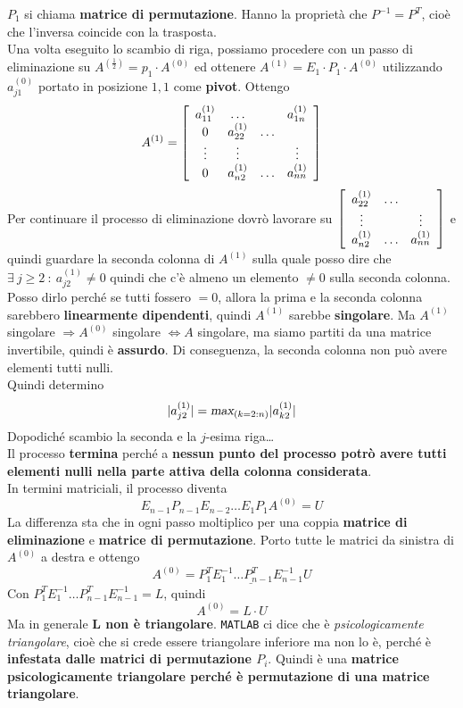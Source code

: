 \documentclass[10pt]{book}
\begin{document}
$P_1$ si chiama \textbf{matrice di permutazione}. Hanno la proprietà che $P^{-1} = P^{T}$, cioè che l'inversa coincide con la trasposta.\\
Una volta eseguito lo scambio di riga, possiamo procedere con un passo di eliminazione su $A^{(\frac{1}{2})} = p_1\cdot A^{(0)}$ ed ottenere $A^{(1)} = E_1\cdot P_1\cdot A^{(0)}$ utilizzando $a_{j1}^{(0)}$ portato in posizione $1, 1$ come \textbf{pivot}. Ottengo
$$A^{(1)} = \left[
\begin{array}{c c c c}
a_{11}^{(1)} & \ldots & & a_{1n}^{(1)} \\
0 & a_{22}^{(1)} & \ldots\\
\vdots & \vdots & & \vdots\\
0 & a_{n2}^{(1)} & \ldots & a_{nn}^{(1)}
\end{array}
\right]$$
Per continuare il processo di eliminazione dovrò lavorare su $\left[
\begin{array}{c c c}
a_{22}^{(1)} & \ldots\\
\vdots & & \vdots\\
a_{n2}^{(1)} & \ldots & a_{nn}^{(1)}
\end{array}
\right]$ e quindi guardare la seconda colonna di $A^{(1)}$ sulla quale posso dire che $\exists\: j \geq 2\: : \: a_{j2}^{(1)} \neq 0$ quindi che c'è almeno un elemento $\neq 0$ sulla seconda colonna. Posso dirlo perché se tutti fossero $= 0$, allora la prima e la seconda colonna sarebbero \textbf{linearmente dipendenti}, quindi $A^{(1)}$ sarebbe \textbf{singolare}. Ma $A^{(1)}$ singolare $\Rightarrow A^{(0)}$ singolare $\Leftrightarrow A$ singolare, ma siamo partiti da una matrice invertibile, quindi è \textbf{assurdo}. Di conseguenza, la seconda colonna non può avere elementi tutti nulli.\\

\pagebreak
Quindi determino $$|a_{j2}^{(1)}| = \textsl{max}_{(k = 2:n)}|a_{k2}^{(1)}|$$
Dopodiché scambio la seconda e la $j$-esima riga\ldots\\
Il processo \textbf{termina} perché a \textbf{nessun punto del processo potrò avere tutti elementi nulli nella parte attiva della colonna considerata}.\\
In termini matriciali, il processo diventa
$$E_{n-1}P_{n-1}E_{n-2}\ldots E_1P_1A^{(0)} = U$$
La differenza sta che in ogni passo moltiplico per una coppia \textbf{matrice di eliminazione} e \textbf{matrice di permutazione}. Porto tutte le matrici da sinistra di $A^{(0)}$ a destra e ottengo
$$A^{(0)} = \underline{P^T_1E^{-1}_1 \ldots P^T_{n-1}E^{-1}_{n-1}} U$$
Con $P^T_1E^{-1}_1 \ldots P^T_{n-1}E^{-1}_{n-1} = L$, quindi
$$A^{(0)} = L\cdot U$$
Ma in generale \textbf{L non è triangolare}. \texttt{MATLAB} ci dice che è \textit{psicologicamente triangolare}, cioè che si crede essere triangolare inferiore ma non lo è, perché è \textbf{infestata dalle matrici di permutazione $P_i$}. Quindi è una \textbf{matrice psicologicamente triangolare perché è permutazione di una matrice triangolare}.
\end{document}

